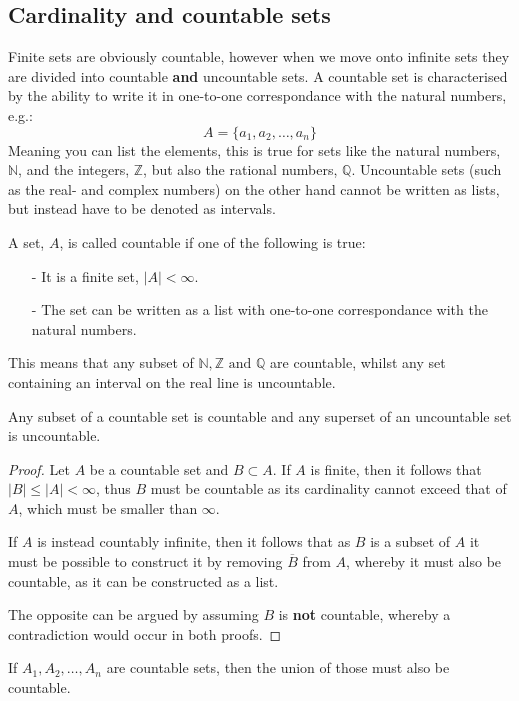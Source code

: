 \subsection{Cardinality and countable sets}
Finite sets are obviously countable, however when we move onto infinite sets they are divided into countable \textbf{and} uncountable sets. A countable set is characterised by the ability to write it in one-to-one correspondance with the natural numbers, e.g.:
\[
    A=\{a_1,a_2,\ldots,a_n\}
\]
Meaning you can list the elements, this is true for sets like the natural numbers, $\mathbb{N}$, and the integers, $\mathbb{Z}$, but also the rational numbers, $\mathbb{Q}$. Uncountable sets (such as the real- and complex numbers) on the other hand cannot be written as lists, but instead have to be denoted as intervals.
\begin{definition}
  A set, $A$, is called countable if one of the following is true:
  \begin{itemize}
      \item[-] It is a finite set, $|A|<\infty$.
      \item[-] The set can be written as a list with one-to-one correspondance with the natural numbers.
  \end{itemize}
\end{definition}
This means that any subset of $\mathbb{N}, \mathbb{Z} \text{ and } \mathbb{Q}$ are countable, whilst any set containing an interval on the real line is uncountable. 
\begin{theorem}
  Any subset of a countable set is countable and any superset of an uncountable set is uncountable.
\end{theorem}
\begin{proof}
  Let $A$ be a countable set and $B\subset A$. If $A$ is finite, then it follows that $|B|\leq|A|<\infty$, thus $B$ must be countable as its cardinality cannot exceed that of $A$, which must be smaller than $\infty$.

  If $A$ is instead countably infinite, then it follows that as $B$ is a subset of $A$ it must be possible to construct it by removing $\overline{B}$ from $A$, whereby it must also be countable, as it can be constructed as a list. 

  The opposite can be argued by assuming $B$ is \textbf{not} countable, whereby a contradiction would occur in both proofs.
\end{proof}
\begin{theorem}
  If $A_1,A_2,\ldots,A_n$ are countable sets, then the union of those must also be countable.
\end{theorem}

